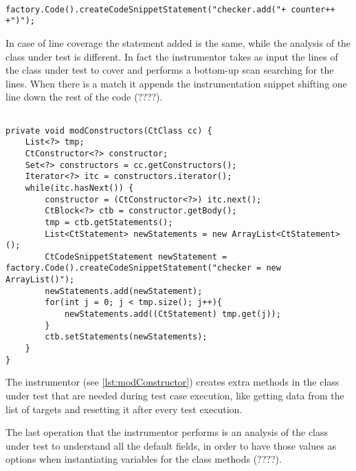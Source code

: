 \begin{minipage}{\linewidth}
\begin{lstlisting}[caption={Snippet creation},label={lst:addSnippet}]% Start your code-block
	
factory.Code().createCodeSnippetStatement("checker.add("+ counter++ +")");
\end{lstlisting}
\end{minipage}

In case of line coverage the statement added is the same, while the analysis of the class under test is different. In fact the instrumentor takes as input the lines of the class under test to cover and performs a bottom-up scan searching for the lines. When there is a match it appends the instrumentation snippet shifting one line down the rest of the code (????).

\begin{minipage}{\linewidth}
\begin{lstlisting}[caption={The function to add the ArrayList instantiation snippet},label={lst:modConstructor}]% Start your code-block

private void modConstructors(CtClass cc) {
	List<?> tmp;
	CtConstructor<?> constructor;
	Set<?> constructors = cc.getConstructors();
	Iterator<?> itc = constructors.iterator();
	while(itc.hasNext()) {
		constructor = (CtConstructor<?>) itc.next();
		CtBlock<?> ctb = constructor.getBody();
		tmp = ctb.getStatements();
		List<CtStatement> newStatements = new ArrayList<CtStatement>();
		CtCodeSnippetStatement newStatement = factory.Code().createCodeSnippetStatement("checker = new ArrayList()");
		newStatements.add(newStatement);
		for(int j = 0; j < tmp.size(); j++){
			newStatements.add((CtStatement) tmp.get(j));
		}
		ctb.setStatements(newStatements);
	}
}
\end{lstlisting}
\end{minipage}

The instrumentor (see \autoref{lst:modConstructor})
creates extra methods in the class under test that are needed during test case execution, like getting data from the list of targets and resetting it after  every test execution.

The last operation that the instrumentor performs is an analysis of the class under test to understand all the default fields, in order to have those values as options when instantiating variables for the class methods (????).